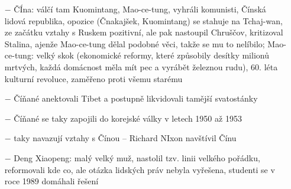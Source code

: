 \documentclass{article}
\begin{document}
\begin{itemize}
    \item[$-$] ČÍna: válčí tam Kuomintang, Mao-ce-tung, vyhráli komunisti, Čínská lidová republika, opozice (Čnakajšek, Kuomintang) se stahuje na Tchaj-wan, ze začátku vztahy s Ruskem pozitivní, ale pak nastoupil Chruščov, kritizoval Stalina, ajenže Mao-ce-tung dělal podobné věci, takže se mu to nelíbilo; Mao-ce-tung: velký skok (ekonomické reformy, které způsobily desítky milionů mrtvých, každá domácnost měla mít pec a vyrábět železnou rudu), 60. léta kulturní revoluce, zaměřeno proti všemu starému
    \item[$-$] Číňané anektovali Tibet a postupně likvidovali tamější svatostánky
    \item[$-$] Číňané se taky zapojili do korejské války v letech 1950 až 1953
    \item[$-$] taky navazují vztahy s Čínou -- Richard NIxon navštívil Čínu
    \item[$-$] Deng Xiaopeng: malý velký muž, nastolil tzv. linii velkého pořádku, reformovali kde co, ale otázka lidských práv nebyla vyřešena, studenti se v roce 1989 domáhali řešení
\end{itemize}
\end{document}
